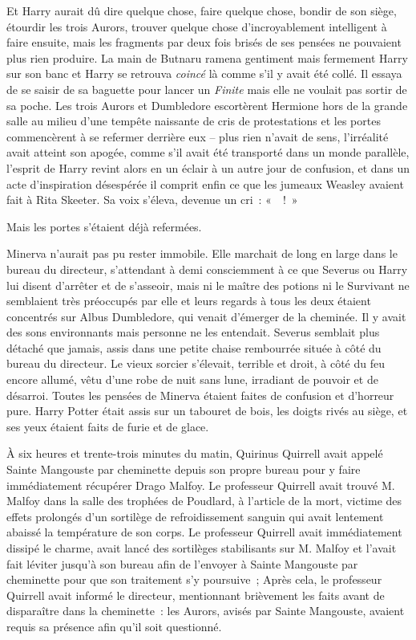 Et Harry aurait dû dire quelque chose, faire quelque chose, bondir de son siège, étourdir les trois Aurors, trouver quelque chose d'incroyablement intelligent à faire ensuite, mais les fragments par deux fois brisés de ses pensées ne pouvaient plus rien produire. La main de Butnaru ramena gentiment mais fermement Harry sur son banc et Harry se retrouva \emph{coincé} là comme s'il y avait été collé. Il essaya de se saisir de sa baguette pour lancer un \emph{Finite} mais elle ne voulait pas sortir de sa poche. Les trois Aurors et Dumbledore escortèrent Hermione hors de la grande salle au milieu d'une tempête naissante de cris de protestations et les portes commencèrent à se refermer derrière eux -- plus rien n'avait de sens, l'irréalité avait atteint son apogée, comme s'il avait été transporté dans un monde parallèle, l'esprit de Harry revint alors en un éclair à un autre jour de confusion, et dans un acte d'inspiration désespérée il comprit enfin ce que les jumeaux Weasley avaient fait à Rita Skeeter. Sa voix s'éleva, devenue un cri~: «~~!~»

Mais les portes s'étaient déjà refermées.

\later

Minerva n'aurait pas pu rester immobile. Elle marchait de long en large dans le bureau du directeur, s'attendant à demi consciemment à ce que Severus ou Harry lui disent d'arrêter et de s'asseoir, mais ni le maître des potions ni le Survivant ne semblaient très préoccupés par elle et leurs regards à tous les deux étaient concentrés sur Albus Dumbledore, qui venait d'émerger de la cheminée. Il y avait des sons environnants mais personne ne les entendait. Severus semblait plus détaché que jamais, assis dans une petite chaise rembourrée située à côté du bureau du directeur. Le vieux sorcier s'élevait, terrible et droit, à côté du feu encore allumé, vêtu d'une robe de nuit sans lune, irradiant de pouvoir et de désarroi. Toutes les pensées de Minerva étaient faites de confusion et d'horreur pure. Harry Potter était assis sur un tabouret de bois, les doigts rivés au siège, et ses yeux étaient faits de furie et de glace.

À six heures et trente-trois minutes du matin, Quirinus Quirrell avait appelé Sainte Mangouste par cheminette depuis son propre bureau pour y faire immédiatement récupérer Drago Malfoy. Le professeur Quirrell avait trouvé M. Malfoy dans la salle des trophées de Poudlard, à l'article de la mort, victime des effets prolongés d'un sortilège de refroidissement sanguin qui avait lentement abaissé la température de son corps. Le professeur Quirrell avait immédiatement dissipé le charme, avait lancé des sortilèges stabilisants sur M. Malfoy et l'avait fait léviter jusqu'à son bureau afin de l'envoyer à Sainte Mangouste par cheminette pour que son traitement s'y poursuive~; Après cela, le professeur Quirrell avait informé le directeur, mentionnant brièvement les faits avant de disparaître dans la cheminette~: les Aurors, avisés par Sainte Mangouste, avaient requis sa présence afin qu'il soit questionné.

